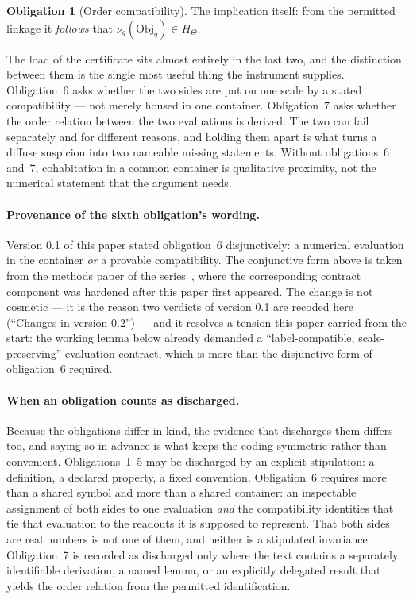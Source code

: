 \documentclass[11pt,a4paper]{article}
\theoremstyle{definition}
\newtheorem{obligation}{Obligation}
\begin{document}
\begin{obligation}[Order compatibility]
\label{obl:seven}
The implication itself: from the permitted linkage it \emph{follows} that
$\nu_q(\mathrm{Obj}_q) \in H_\Theta$.
\end{obligation}

The load of the certificate sits almost entirely in the last two, and the
distinction between them is the single most useful thing the instrument supplies.
Obligation~6 asks whether the two sides are put on one scale by a stated
compatibility --- not merely housed in one container. Obligation~7 asks whether
the order relation between the two evaluations is derived. The two can fail
separately and for different reasons, and holding them apart is what turns a
diffuse suspicion into two nameable missing statements. Without obligations~6
and~7, cohabitation in a common container is qualitative proximity, not the
numerical statement that the argument needs.

\paragraph{Provenance of the sixth obligation's wording.} Version 0.1 of this
paper stated obligation~6 disjunctively: a numerical evaluation in the container
\emph{or} a provable compatibility. The conjunctive form above is taken from the
methods paper of the series~\cite{GeigerBCM2026}, where the corresponding
contract component was hardened after this paper first appeared. The change is
not cosmetic --- it is the reason two verdicts of version 0.1 are recoded here
(``Changes in version 0.2'') --- and it resolves a tension this paper carried
from the start: the working lemma below already demanded a
``label-compatible, scale-preserving'' evaluation contract, which is more than
the disjunctive form of obligation~6 required.

\paragraph{When an obligation counts as discharged.} Because the obligations differ
in kind, the evidence that discharges them differs too, and saying so in advance is
what keeps the coding symmetric rather than convenient. Obligations~1--5 may be
discharged by an explicit stipulation: a definition, a declared property, a fixed
convention. Obligation~6 requires more than a shared symbol and more than a
shared container: an inspectable assignment of both sides to one evaluation
\emph{and} the compatibility identities that tie that evaluation to the readouts
it is supposed to represent. That both sides are real numbers is not one of them,
and neither is a stipulated invariance. Obligation~7 is recorded as discharged
only where the text
contains a separately identifiable derivation, a named lemma, or an explicitly
delegated result that yields the order relation from the permitted identification.
\end{document}
